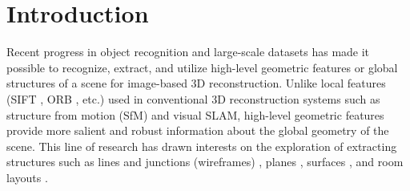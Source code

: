 \documentclass[10pt,twocolumn,letterpaper]{article}
\begin{document}
\section{Introduction} \label{sec:introduction}
Recent progress in object recognition \cite{krizhevsky2012imagenet, szegedy2015going, simonyan2014very, he2016deep} and large-scale datasets \cite{ILSVRC15, dai2017scannet, chang2015shapenet, armeni2017joint} has made it possible to recognize, extract, and utilize high-level geometric features or global structures of a scene for image-based 3D reconstruction. Unlike local features (SIFT \cite{lowe1999object}, ORB \cite{rublee2011orb}, etc.) used in conventional 3D reconstruction systems such as structure from motion (SfM) and visual SLAM, high-level geometric features provide more salient and robust information about the global geometry of the scene. This line of research has drawn interests on the exploration of extracting structures such as lines and junctions (wireframes) \cite{Huang:2018:LPW}, planes \cite{yang2018recovering,liu2018planenet}, surfaces \cite{groueix2018papier}, and room layouts \cite{zou2018layoutnet}.  
\end{document}
